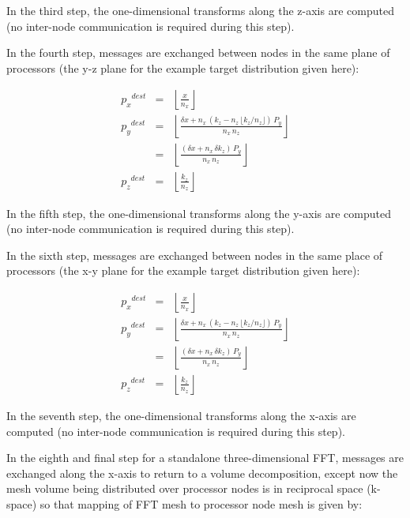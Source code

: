 \documentclass[pdftex,finalversion,simpleeqnnos,titlepage,12pt]{article}
\newcommand{\nodecount}{\ensuremath{P}}
\newcommand{\nodemeshsize}[1]{\ensuremath{\nodecount_{#1}}}
\newcommand{\nodecoord}[1]{\ensuremath{p_{#1}}}
\newcommand{\meshpernode}[1]{\ensuremath{n_{#1}}}
\begin{document}
In the third step, the one-dimensional transforms along the z-axis are
computed (no inter-node communication is required during this step).

In the fourth step, messages are exchanged between nodes in the same
plane of processors (the y-z plane for the example target distribution
given here):

\begin{eqnarray*}
\nodecoord{x}^{dest} & = & \left\lfloor \frac{x}{\meshpernode{x}} \right\rfloor \\
\nodecoord{y}^{dest} & = & \left\lfloor\frac{\delta x +
  \meshpernode{x}\,(k_z-\meshpernode{z}\,\lfloor
  k_z/\meshpernode{z}\rfloor)\,\nodemeshsize{y}}{\meshpernode{x}\,\meshpernode{z}} \right\rfloor \\
& = & \left\lfloor\frac{(\delta x + \meshpernode{x}\,\delta
 k_z )\,\nodemeshsize{y}}{\meshpernode{x}\,\meshpernode{z}}
\right\rfloor \nonumber \\ 
\nodecoord{z}^{dest} & = & \left\lfloor\frac{k_z}{\meshpernode{z}}\right\rfloor
\end{eqnarray*}

In the fifth step, the one-dimensional transforms along the y-axis are
computed (no inter-node communication is required during this step).

In the sixth step, messages are exchanged between nodes in the same
place of processors (the x-y plane for the example target distribution
given here):

\begin{eqnarray*}
\nodecoord{x}^{dest} & = & \left\lfloor \frac{x}{\meshpernode{x}} \right\rfloor \\
\nodecoord{y}^{dest} & = & \left\lfloor\frac{\delta x +
  \meshpernode{x}\,(k_z-\meshpernode{z}\,\lfloor
  k_z/\meshpernode{z}\rfloor)\,\nodemeshsize{y}}{\meshpernode{x}\,\meshpernode{z}} \right\rfloor \\
& = & \left\lfloor\frac{(\delta x + \meshpernode{x}\,\delta
 k_z )\,\nodemeshsize{y}}{\meshpernode{x}\,\meshpernode{z}}
\right\rfloor \nonumber \\ 
\nodecoord{z}^{dest} & = & \left\lfloor\frac{k_z}{\meshpernode{z}}\right\rfloor
\end{eqnarray*}

In the seventh step, the one-dimensional transforms along the x-axis
are computed (no inter-node communication is required during this
step).

In the eighth and final step for a standalone three-dimensional FFT,
messages are exchanged along the x-axis to return to a volume
decomposition, except now the mesh volume being distributed over
processor nodes is in reciprocal space (k-space) so that mapping of
FFT mesh to processor node mesh is given by:
\end{document}
